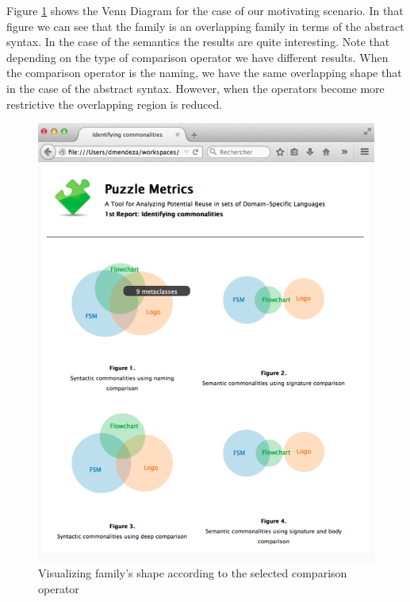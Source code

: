 Figure \ref{fig:shape} shows the Venn Diagram for the case of our motivating scenario. In that figure we can see that the family is an overlapping family in terms of the abstract syntax. In the case of the semantics the results are quite interesting. Note that depending on the type of comparison operator we have different results. When the comparison operator is the naming, we have the same overlapping shape that in the case of the abstract syntax. However, when the operators become more restrictive the overlapping region is reduced. 

\begin{figure}
\centering
\includegraphics[width=1\linewidth]{images/domains-inaction.pdf}
\caption{Visualizing family's shape according to the selected comparison operator}
\label{fig:shape}
\end{figure}


